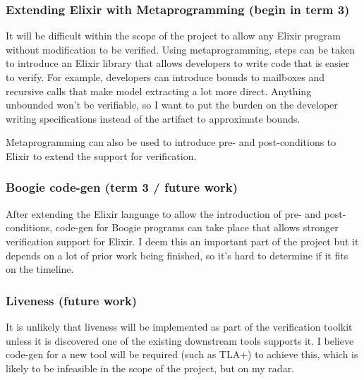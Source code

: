 \subsubsection{Extending Elixir with Metaprogramming (begin in term 3)}
It will be difficult within the scope of the project to allow any Elixir program without modification to be verified. Using metaprogramming, steps can be taken to introduce an Elixir library that allows developers to write code that is easier to verify. For example, developers can introduce bounds to mailboxes and recursive calls that make model extracting a lot more direct. Anything unbounded won't be verifiable, so I want to put the burden on the developer writing specifications instead of the artifact to approximate bounds.
\par
Metaprogramming can also be used to introduce pre- and post-conditions to Elixir to extend the support for verification.
\subsubsection{Boogie code-gen (term 3 / future work)}
After extending the Elixir language to allow the introduction of pre- and post-conditions, code-gen for Boogie programs can take place that allows stronger verification support for Elixir. I deem this an important part of the project but it depends on a lot of prior work being finished, so it's hard to determine if it fits on the timeline.
\subsubsection{Liveness (future work)}
It is unlikely that liveness will be implemented as part of the verification toolkit unless it is discovered one of the existing downstream tools supports it. I believe code-gen for a new tool will be required (such as TLA+) to achieve this, which is likely to be infeasible in the scope of the project, but on my radar.
